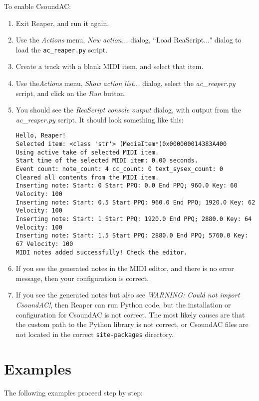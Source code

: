 \documentclass[letterpaper,10pt,DIV=12]{scrartcl}
\begin{document}
\noindent To enable CsoundAC:

\begin{enumerate}
\item Exit Reaper, and run it again.
\item Use the \emph{Actions} menu, \emph{New action...} dialog, ``Load ReaScript..." dialog to load the \lstinline|ac_reaper.py| script.
\item Create a track with a blank MIDI item, and select that item.
\item Use the\emph{Actions} menu, \emph{Show action list...} dialog, select the \emph{ac\_reaper.py} script, and click on the \emph{Run} button. 
\item You should see the \emph{ReaScript console output} dialog, with output from the \emph{ac\_reaper.py} script. It should look something like this:

\begin{lstlisting}[basicstyle=\small\ttfamily]
Hello, Reaper!
Selected item: <class 'str'> (MediaItem*)0x000000014383A400
Using active take of selected MIDI item.
Start time of the selected MIDI item: 0.00 seconds.
Event count: note_count: 4 cc_count: 0 text_sysex_count: 0
Cleared all contents from the MIDI item.
Inserting note: Start: 0 Start PPQ: 0.0 End PPQ; 960.0 Key: 60 Velocity: 100
Inserting note: Start: 0.5 Start PPQ: 960.0 End PPQ; 1920.0 Key: 62 Velocity: 100
Inserting note: Start: 1 Start PPQ: 1920.0 End PPQ; 2880.0 Key: 64 Velocity: 100
Inserting note: Start: 1.5 Start PPQ: 2880.0 End PPQ; 5760.0 Key: 67 Velocity: 100
MIDI notes added successfully! Check the editor.
\end{lstlisting}
\item If you see the generated notes in the MIDI editor, and there is no error message, then your configuration is correct.
\item If you see the generated notes but also see \emph{WARNING: Could not import CsoundAC!}, then Reaper can run Python code, but the installation or configuration for CsoundAC is not correct. The most likely causes are that the custom path to the Python library is not correct, or CsoundAC files are not located in the correct \lstinline|site-packages| directory.
\end{enumerate}

\section{Examples}

The following examples proceed step by step:
\end{document}
